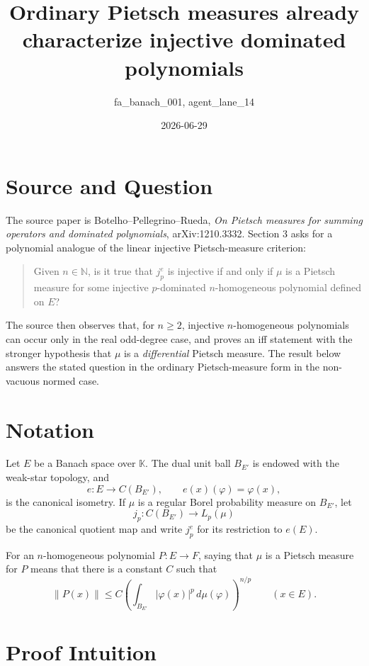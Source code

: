 \documentclass[11pt]{article}
\title{Ordinary Pietsch measures already characterize injective dominated polynomials}
\author{fa\_banach\_001, agent\_lane\_14}
\date{2026-06-29}
\newcommand{\K}{\mathbb K}
\begin{document}
\maketitle

\section*{Source and Question}

The source paper is Botelho--Pellegrino--Rueda, \emph{On Pietsch
measures for summing operators and dominated polynomials},
arXiv:1210.3332.  Section 3 asks for a polynomial analogue of the
linear injective Pietsch-measure criterion:

\begin{quote}
Given \(n\in\mathbb N\), is it true that \(j_p^e\) is injective if and
only if \(\mu\) is a Pietsch measure for some injective
\(p\)-dominated \(n\)-homogeneous polynomial defined on \(E\)?
\end{quote}

The source then observes that, for \(n\ge2\), injective
\(n\)-homogeneous polynomials can occur only in the real odd-degree
case, and proves an iff statement with the stronger hypothesis that
\(\mu\) is a \emph{differential} Pietsch measure.  The result below
answers the stated question in the ordinary Pietsch-measure form in the
non-vacuous normed case.

\section*{Notation}

Let \(E\) be a Banach space over \(\K\).  The dual unit ball
\(B_{E'}\) is endowed with the weak-star topology, and
\[
  e:E\longrightarrow C(B_{E'}),\qquad e(x)(\varphi)=\varphi(x),
\]
is the canonical isometry.  If \(\mu\) is a regular Borel probability
measure on \(B_{E'}\), let
\[
  j_p:C(B_{E'})\longrightarrow L_p(\mu)
\]
be the canonical quotient map and write \(j_p^e\) for its restriction
to \(e(E)\).

For an \(n\)-homogeneous polynomial \(P:E\to F\), saying that \(\mu\)
is a Pietsch measure for \(P\) means that there is a constant \(C\)
such that
\[
  \|P(x)\|\le C
  \left(\int_{B_{E'}} |\varphi(x)|^p\,d\mu(\varphi)\right)^{n/p}
  \qquad (x\in E).
\]

\section*{Proof Intuition}
\end{document}
